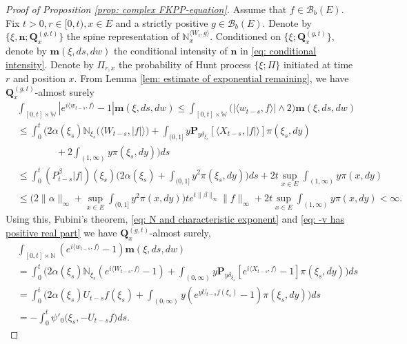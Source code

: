 \documentclass[UTF8]{pkuthss}
\theoremstyle{plain}
\theoremstyle{definition}
\numberwithin{equation}{section}
\begin{document}
\begin{proof}[Proof of Proposition \ref{prop: complex FKPP-equation}]
    Assume that $f\in \mathcal B_b(E)$.
    Fix $t>0, r\in [0,t), x\in E$ and a strictly positive $g\in \mathcal B_b(E)$.
    Denote by $\{\xi, \mathbf n; \mathbf Q_x^{(g,t)}\}$ the spine representation of $\mathbb N_x^{\langle W_t, g\rangle}$.
    Conditioned on $\{\xi; \mathbf Q_x^{(g,t)}\}$, denote by $\mathbf m(\xi, ds,dw)$ the conditional intensity of $\mathbf n$ in \eqref{eq: conditional intensity}.
    Denote by $\Pi_{r,x}$ the probability of Hunt process $\{\xi; \Pi\}$ initiated at time $r$ and position $x$.
    From Lemma \ref{lem: estimate of exponential remaining}, we have $\mathbf Q^{(g,t)}_{x}$-almost surely
\begin{align}
    &\int_{[0,t]\times \mathbb W}|e^{i \langle w_{t-s}, f\rangle} - 1| \mathbf m(\xi, ds,dw)
    \leq \int_{[0,t]\times \mathbb W}\big(| \langle w_{t-s}, f\rangle| \wedge 2\big) \mathbf m(\xi, ds,dw)
    \\&\leq \int_0^t \Big(2\alpha(\xi_s)\mathbb N_{\xi_s}\big( \langle W_{t-s}, |f|\rangle\big)  + \int_{(0,1]} y \mathbf P_{y \delta_{\xi_s}}[\langle X_{t-s}, |f|\rangle] \pi(\xi_s,dy)
    \\&\qquad\qquad+ 2\int_{(1,\infty)}y\pi(\xi_s,dy)\Big) ds
     \\&\leq \int_0^t (P_{t-s}^{\beta} |f|)(\xi_s)\Big(2\alpha(\xi_s)  + \int_{(0,1]} y^2 \pi(\xi_s,dy)\Big) ds + 2t \sup_{x\in E}\int_{(1,\infty)}y\pi(x,dy)
    \\&\leq \Big(2\|\alpha\|_\infty +\sup_{x\in E}\int_{(0,1]} y^2 \pi(x,dy)\Big) t e^{t\|\beta\|_\infty}\|f\|_\infty + 2t \sup_{x\in E}\int_{(1,\infty)}y\pi(x,dy)
    < \infty.
\end{align}
    Using this, Fubini's theorem, \eqref{eq: N and characteristic exponent} and \eqref{eq: -v has positive real part} we have $\mathbf Q^{(g,t)}_{x}$-almost surely,
\begin{align}
    &\int_{[0,t]\times \mathbb N}(e^{i \langle w_{t-s}, f\rangle} - 1) \mathbf m(\xi, ds,dw)
    \\&=\int_0^t \Big(2\alpha(\xi_s)\mathbb N_{\xi_s}(e^{i \langle W_{t-s}, f\rangle} - 1)  + \int_{(0,\infty)} y \mathbf P_{y \delta_{\xi_s}}[e^{i \langle X_{t-s}, f\rangle} - 1] \pi(\xi_s,dy)\Big) ds
    \\&=\int_0^t \Big( 2\alpha(\xi_s) U_{t-s} f(\xi_s) + \int_{(0,\infty)} y (e^{y U_{t-s}f(\xi_s)} - 1) \pi(\xi_s,dy) \Big) ds
    \\&= -\int_0^t \psi'_0 \big(\xi_s, -U_{t-s}f\big)ds.

\end{align}
\end{proof}
\end{document}
